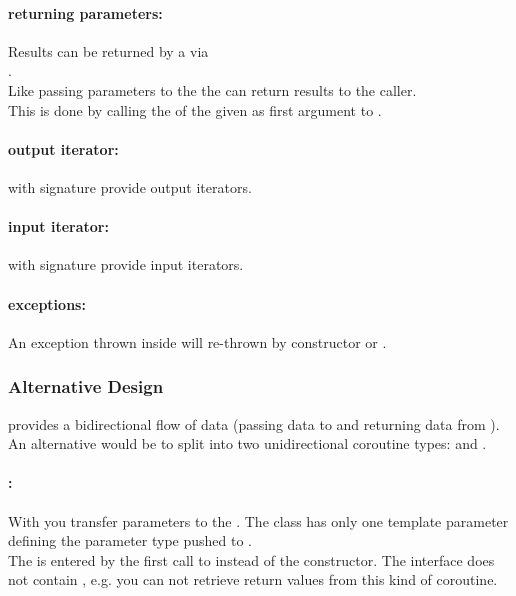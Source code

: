 \paragraph*{returning parameters:}
Results can be returned by a \corofunction via\\\coroop.\\
\newline
Like passing parameters to the \corofunction the \corofunction can return
results to the caller.\\ This is done by calling the \coroop of the \coro given
as first argument to \corofunction.

\paragraph*{output iterator:}
\coro with signature  provide output iterators.

\paragraph*{input iterator:}
\coro with signature  provide input iterators.

\paragraph*{exceptions:}
An exception thrown inside \corofunction will re-thrown by \coro constructor or
\coroop.

\subsubsection*{Alternative Design}
\coro provides a bidirectional flow of data (passing data to and returning data
from \corofunction). An alternative would be to split \coro into two
unidirectional coroutine types: \pushcoro and \pullcoro.\\

\paragraph*{\pushcoro:}
With \pushcoro you transfer parameters to the \corofunction. The class has
only one template parameter defining the parameter type pushed to
\corofunction.\\
\newline
The \corofunction is entered by the first call to \pushcoroop instead of the
constructor. The interface does not contain \coroget, e.g. you can not
retrieve return values from this kind of coroutine.

